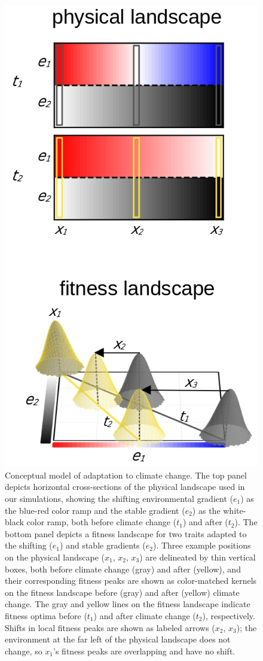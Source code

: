 \documentclass[9pt,twocolumn,twoside,lineno]{new_article}
\begin{document}
\begin{figure}%
\centering
\includegraphics[width=.8\linewidth]{pub/figs_and_stats/FIG_1_conceptual.jpg}
    \caption{Conceptual model of adaptation to climate change. The top panel depicts horizontal cross-sections of the physical landscape used in our simulations, showing the shifting environmental gradient ($e_{1}$) as the blue-red color ramp and the stable gradient ($e_{2}$) as the white-black color ramp, both before climate change ($t_{1}$) and after ($t_{2}$). The bottom panel depicts a fitness landscape for two traits adapted to the shifting ($e_{1}$) and stable gradients ($e_{2}$). Three example positions on the physical landscape ($x_{1}$, $x_{2}$, $x_{3}$) are delineated by thin vertical boxes, both before climate change (gray) and after (yellow), and their corresponding fitness peaks are shown as color-matched kernels on the fitness landscape before (gray) and after (yellow) climate change. The gray and yellow lines on the fitness landscape indicate fitness optima before ($t_{1}$) and after climate change ($t_{2}$), respectively. Shifts in local fitness peaks are shown as labeled arrows ($x_{2}$, $x_{3}$); the environment at the far left of the physical landscape does not change, so $x_{1}$'s fitness peaks are overlapping and have no shift.}
\label{fig:fig_1}
\end{figure}
\end{document}

